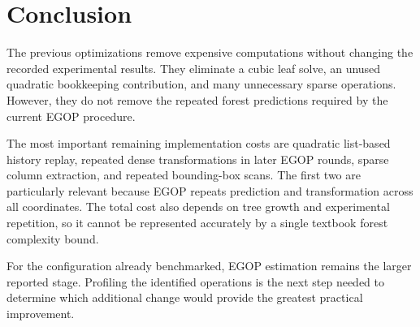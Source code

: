 \documentclass[11pt]{article}
\begin{document}
\section{Conclusion}

The previous optimizations remove expensive computations without changing the recorded experimental results. They eliminate a cubic leaf solve, an unused quadratic bookkeeping contribution, and many unnecessary sparse operations. However, they do not remove the repeated forest predictions required by the current EGOP procedure.

The most important remaining implementation costs are quadratic list-based history replay, repeated dense transformations in later EGOP rounds, sparse column extraction, and repeated bounding-box scans. The first two are particularly relevant because EGOP repeats prediction and transformation across all coordinates. The total cost also depends on tree growth and experimental repetition, so it cannot be represented accurately by a single textbook forest complexity bound.

For the configuration already benchmarked, EGOP estimation remains the larger reported stage. Profiling the identified operations is the next step needed to determine which additional change would provide the greatest practical improvement.

\appendix
\end{document}
